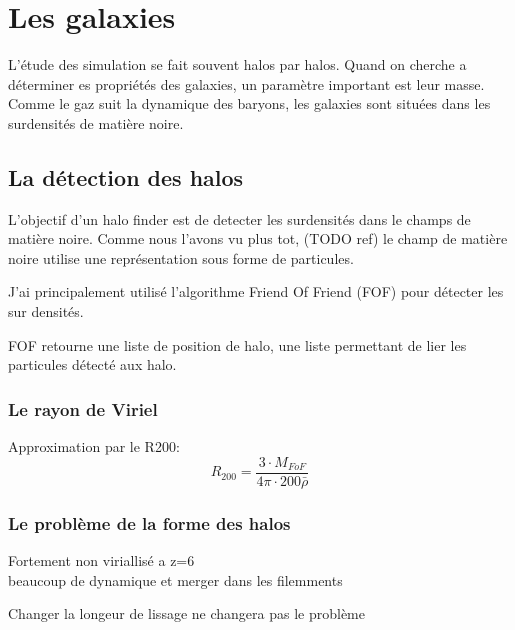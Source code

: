 \chapter{Les galaxies}

L'étude des simulation se fait souvent halos par halos.
Quand on cherche a déterminer es propriétés des galaxies, un paramètre important est leur masse.
Comme le gaz suit la dynamique des baryons, les galaxies sont situées dans les surdensités de matière noire.




\section{La détection des halos}

L'objectif d'un halo finder est de detecter les surdensités dans le champs de matière noire.
Comme nous l'avons vu plus tot, (TODO ref) le champ de matière noire utilise une représentation sous forme de particules.

J'ai principalement utilisé l’algorithme Friend Of Friend (FOF) pour détecter les sur densités.

FOF retourne une liste de position de halo, une liste permettant de lier les particules détecté aux halo.

\subsection{Le rayon de Viriel}
Approximation par le R200:
\begin{equation}
R_{200}=\frac{3\cdot M_{FoF} }{4\pi\cdot 200 \bar{\rho} }
\end{equation}


\subsection{Le problème de la forme des halos}
Fortement non viriallisé a z=6\\
beaucoup de dynamique et merger dans les filemments

Changer la longeur de lissage ne changera pas le problème 

